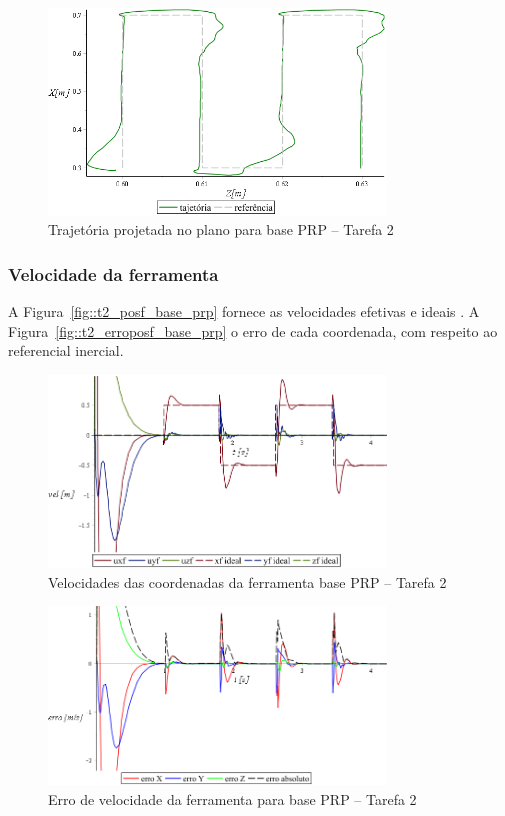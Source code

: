 \begin{figure}[h!]
	\centering 
 	\includegraphics[width=0.80\textwidth]{figs/t2_traj_base_prp}
 	\caption{Trajetória projetada no plano para base PRP -- Tarefa 2}
 	\label{fig::t2_traj_base_prp}
\end{figure}


\subsubsection{Velocidade da ferramenta}

A Figura~\ref{fig::t2_posf_base_prp} fornece as velocidades
efetivas e ideais . A Figura~\ref{fig::t2_erroposf_base_prp} o erro de cada
coordenada, com respeito ao referencial inercial.

\begin{figure}[h!]
	\centering 
 	\includegraphics[width=0.80\textwidth]{figs/t2_velf_base_prp}
 	\caption{Velocidades das coordenadas da ferramenta base PRP --
 	Tarefa 2}
 	\label{fig::t2_velf_base_prp}
\end{figure}

\begin{figure}[h!]
	\centering 
 	\includegraphics[width=0.80\textwidth]{figs/t2_errovelf_base_prp}
 	\caption{Erro de velocidade da ferramenta para base PRP --
 	Tarefa 2}
 	\label{fig::t2_errovelf_base_prp}
\end{figure}


